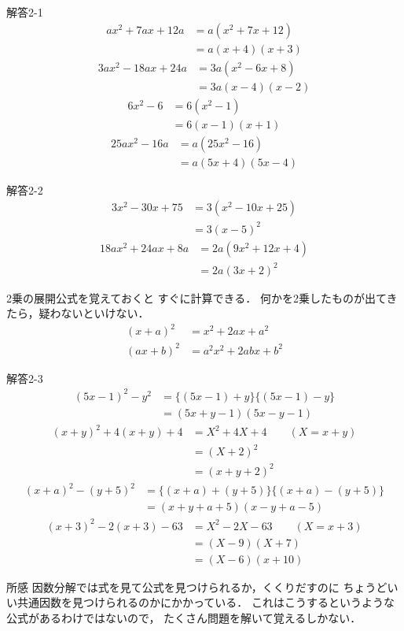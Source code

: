 \documentclass[dvipdfmx]{beamer}
\begin{document}
\begin{frame}{解答2-1}
	\begin{align*}
		ax^2+7ax+12a &= a(x^2+7x+12)\\
					 &= a(x+4)(x+3)
	\end{align*}
	\begin{align*}
		3ax^2-18ax+24a &=3a(x^2-6x+8)\\
					   &=3a(x-4)(x-2)
	\end{align*}
	\begin{align*}
		6x^2-6 &= 6(x^2-1)\\
			   &=6(x-1)(x+1)
	\end{align*}
	\begin{align*}
		25ax^2-16a &= a(25x^2-16)\\
				   &= a(5x+4)(5x-4)
	\end{align*}

\end{frame}

\begin{frame}{解答2-2}
	\begin{align*}
		3x^2-30x+75&= 3(x^2-10x+25)\\
				   &= 3(x-5)^2
	\end{align*}
	\begin{align*}
		18ax^2+24ax+8a&= 2a(9x^2+12x+4)\\
					  &= 2a(3x+2)^2
	\end{align*}

	2乗の展開公式を覚えておくと
	すぐに計算できる．
	何かを2乗したものが出てきたら，疑わないといけない．
	\begin{align*}
		(x+a)^2 &= x^2+2ax+a^2\\
		(ax+b)^2 &= a^2x^2 +2abx+b^2
	\end{align*}
	
\end{frame}

\begin{frame}{解答2-3}
	\begin{align*}
		(5x-1)^2 - y^2&= \{(5x-1)+y\}\{(5x-1)-y\}\\
					  &= (5x+y-1)(5x-y-1)
	\end{align*}
	\begin{align*}
		(x+y)^2+4(x+y)+4&=X^2 +4X +4\qquad (X=x+y)\\
						&= (X+2)^2\\
						&= (x+y+2)^2
	\end{align*}
	\begin{align*}
		(x+a)^2-(y+5)^2&= \{(x+a)+(y+5)\}\{(x+a)-(y+5)\}\\
					   &=(x+y+a+5)(x-y+a-5)
	\end{align*}
	\begin{align*}
		(x+3)^2-2(x+3)-63 &= X^2-2X-63\qquad(X=x+3)\\
						  &= (X-9)(X+7)\\
						  &= (X-6)(x+10)
	\end{align*}
	
\end{frame}

\begin{frame}{所感}
	因数分解では式を見て公式を見つけられるか，くくりだすのに
	ちょうどいい共通因数を見つけられるのかにかかっている．
	これはこうするというような公式があるわけではないので，
	たくさん問題を解いて覚えるしかない．
\end{frame}
\end{document}

